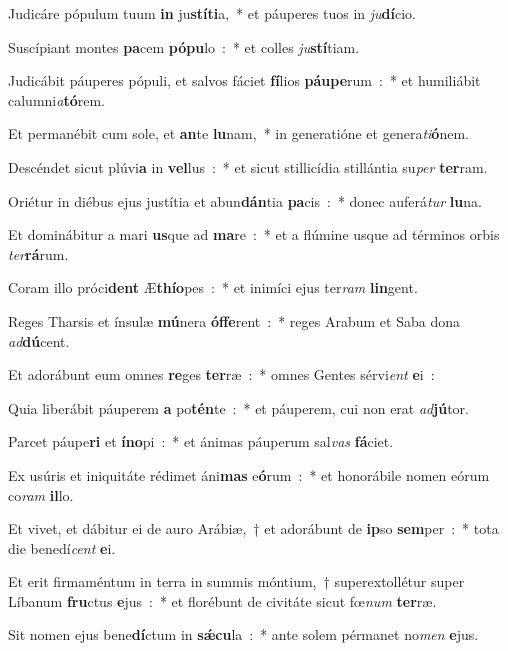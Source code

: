 \item Judicáre pópulum tuum \textbf{in} ju\textbf{stí}\textbf{ti}a,~* et páuperes tuos in \emph{ju}\textbf{dí}cio.
\item Suscípiant montes \textbf{pa}cem \textbf{pó}\textbf{pu}lo~:~* et colles \emph{ju}\textbf{stí}tiam.
\item Judicábit páuperes pópuli, et salvos fáciet \textbf{fí}lios \textbf{páu}\textbf{pe}rum~:~* et humiliábit calumni\emph{a}\textbf{tó}rem.
\item Et permanébit cum sole, et \textbf{an}te \textbf{lu}nam,~* in generatióne et genera\emph{ti}\textbf{ó}nem.
\item Descéndet sicut plúvi\textbf{a} in \textbf{vel}lus~:~* et sicut stillicídia stillántia su\emph{per} \textbf{ter}ram.
\item Oriétur in diébus ejus justítia et abun\textbf{dán}tia \textbf{pa}cis~:~* donec auferá\emph{tur} \textbf{lu}na.
\item Et dominábitur a mari \textbf{us}que ad \textbf{ma}re~:~* et a flúmine usque ad términos orbis \emph{ter}\textbf{rá}rum.
\item Coram illo próci\textbf{dent} Æ\textbf{thí}\textbf{o}pes~:~* et inimíci ejus ter\emph{ram} \textbf{lin}gent.
\item Reges Tharsis et ínsulæ \textbf{mú}nera \textbf{óf}\textbf{fe}rent~:~* reges Arabum et Saba dona \emph{ad}\textbf{dú}cent.
\item Et adorábunt eum omnes \textbf{re}ges \textbf{ter}ræ~:~* omnes Gentes sérvi\emph{ent} \textbf{e}i~:
\item Quia liberábit páuperem \textbf{a} po\textbf{tén}te~:~* et páuperem, cui non erat \emph{ad}\textbf{jú}tor.
\item Parcet páupe\textbf{ri} et \textbf{ín}\textbf{o}pi~:~* et ánimas páuperum sal\emph{vas} \textbf{fá}ciet.
\item Ex usúris et iniquitáte rédimet áni\textbf{mas} e\textbf{ó}rum~:~* et honorábile nomen eórum co\emph{ram} \textbf{il}lo.
\item Et vivet, et dábitur ei de auro Arábiæ,~† et adorábunt de \textbf{ip}so \textbf{sem}per~:~* tota die benedí\emph{cent} \textbf{e}i.
\item Et erit firmaméntum in terra in summis móntium,~† superextollétur super Líbanum \textbf{fru}ctus \textbf{e}jus~:~* et florébunt de civitáte sicut fœ\emph{num} \textbf{ter}ræ.
\item Sit nomen ejus bene\textbf{dí}ctum in \textbf{sǽ}\textbf{cu}la~:~* ante solem pérmanet no\emph{men} \textbf{e}jus.
